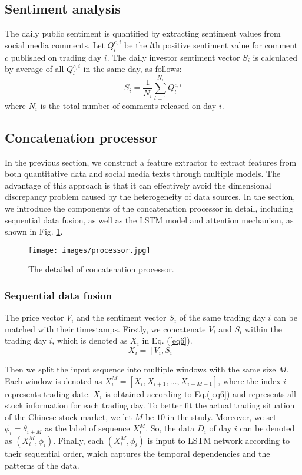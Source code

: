 \documentclass[sn-mathphys]{sn-jnl}%
\theoremstyle{thmstyleone}%
\theoremstyle{thmstyletwo}%
\theoremstyle{thmstylethree}%
\begin{document}
\subsection{Sentiment analysis}\label{Sentiment analysis}
The daily public sentiment is quantified by extracting sentiment values from social media comments. Let $Q^{c,i}_l$ be the $l$th positive sentiment value for comment $c$ published on trading day $i$. The daily investor sentiment vector $S_i$ is calculated by average of all $Q^{c,i}_l$ in the same day, as follows:
\begin{equation}
S_i=\frac{1}{N_i} \sum_{l=1}^{N_i}Q^{c,i}_l  \label{eq5}
\end{equation}
where $N_i$ is the total number of comments released on day $i$.

\subsection{Concatenation processor}\label{Concatenation processor}
In the previous section, we construct a feature extractor to extract features from both quantitative data and social media texts through multiple models. The advantage of this approach is that it can effectively avoid the dimensional discrepancy problem caused by the heterogeneity of data sources. In the section, we introduce the components of the concatenation processor in detail, including sequential data fusion, as well as the LSTM model and attention mechanism, as shown in Fig. \ref{fig2}.

\begin{figure}[h]%
	\centering
	\texttt{[image: images/processor.jpg]}
	\caption{The detailed of concatenation processor.} \label{fig2}
\end{figure}

\subsubsection{Sequential data fusion}\label{Sequential data fusion}
The price vector $V_i$ and the sentiment vector $S_i$ of the same trading day $i$ can be matched with their timestamps. Firstly, we concatenate $V_i$ and $S_i$ within the trading day $i$, which is denoted as $X_i$ in Eq. (\ref{eq6}).
\begin{equation}
	X_i=\left[V_i, S_i\right] \label{eq6}
\end{equation}

Then we split the input sequence into multiple windows with the same size $M$. Each window is denoted as $X_i^M=\left[X_{i}, X_{i+1}, \ldots, X_{i+M-1}\right]$, where the index $i$ represents trading date. $X_i$ is obtained according to Eq.(\ref{eq6}) and represents all stock information for each trading day. To better fit the actual trading situation of the Chinese stock market, we let $M$ be $10$ in the study. Moreover, we set $\phi_i=\theta_{i+M}$ as the label of sequence $X_i^M$. So, the data $D_i$ of day $i$ can be denoted as $\left(X_i^M,\phi_i\right)$. Finally, each $\left(X_i^M,\phi_i\right)$ is input to LSTM network according to their sequential order, which captures the temporal dependencies and the patterns of the data.
\end{document}
